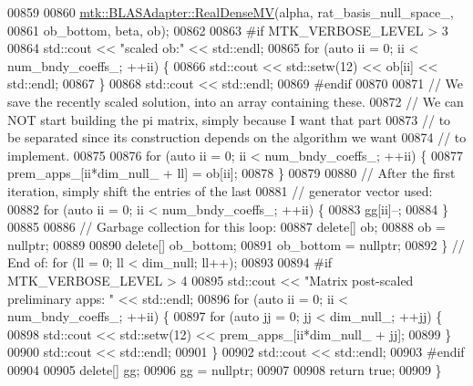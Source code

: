 \begin{DoxyCode}
{{00859 
00860     \hyperlink{classmtk_1_1BLASAdapter_afdcac059a4294287cb55638221220646}{mtk::BLASAdapter::RealDenseMV}(alpha, rat\_basis\_null\_space\_,
00861                                   ob\_bottom, beta, ob);
00862 
00863 \textcolor{preprocessor}{    #if MTK\_VERBOSE\_LEVEL > 3}
00864     std::cout << \textcolor{stringliteral}{"scaled ob:"} << std::endl;
00865     \textcolor{keywordflow}{for} (\textcolor{keyword}{auto} ii = 0; ii < num\_bndy\_coeffs\_; ++ii) \{
00866       std::cout << std::setw(12) << ob[ii] << std::endl;
00867     \}
00868     std::cout << std::endl;
00869 \textcolor{preprocessor}{    #endif}
00870 
00871     \textcolor{comment}{// We save the recently scaled solution, into an array containing these.}
00872     \textcolor{comment}{// We can NOT start building the pi matrix, simply because I want that part}
00873     \textcolor{comment}{// to be separated since its construction depends on the algorithm we want}
00874     \textcolor{comment}{// to implement.}
00875 
00876     \textcolor{keywordflow}{for} (\textcolor{keyword}{auto} ii = 0; ii < num\_bndy\_coeffs\_; ++ii) \{
00877       prem\_apps\_[ii*dim\_null\_ + ll] = ob[ii];
00878     \}
00879 
00880     \textcolor{comment}{// After the first iteration, simply shift the entries of the last}
00881     \textcolor{comment}{// generator vector used:}
00882     \textcolor{keywordflow}{for} (\textcolor{keyword}{auto} ii = 0; ii < num\_bndy\_coeffs\_; ++ii) \{
00883       gg[ii]--;
00884     \}
00885 
00886     \textcolor{comment}{// Garbage collection for this loop:}
00887     \textcolor{keyword}{delete}[] ob;
00888     ob = \textcolor{keyword}{nullptr};
00889 
00890     \textcolor{keyword}{delete}[] ob\_bottom;
00891     ob\_bottom = \textcolor{keyword}{nullptr};
00892   \} \textcolor{comment}{// End of: for (ll = 0; ll < dim\_null; ll++);}
00893 
00894 \textcolor{preprocessor}{  #if MTK\_VERBOSE\_LEVEL > 4}
00895   std::cout << \textcolor{stringliteral}{"Matrix post-scaled preliminary apps: "} << std::endl;
00896   \textcolor{keywordflow}{for} (\textcolor{keyword}{auto} ii = 0; ii < num\_bndy\_coeffs\_; ++ii) \{
00897     \textcolor{keywordflow}{for} (\textcolor{keyword}{auto} jj = 0; jj < dim\_null\_; ++jj) \{
00898       std::cout << std::setw(12) << prem\_apps\_[ii*dim\_null\_ + jj];
00899     \}
00900     std::cout << std::endl;
00901   \}
00902   std::cout << std::endl;
00903 \textcolor{preprocessor}{  #endif}
00904 
00905   \textcolor{keyword}{delete}[] gg;
00906   gg = \textcolor{keyword}{nullptr};
00907 
00908   \textcolor{keywordflow}{return} \textcolor{keyword}{true};
00909 \}
}}
\end{DoxyCode}
